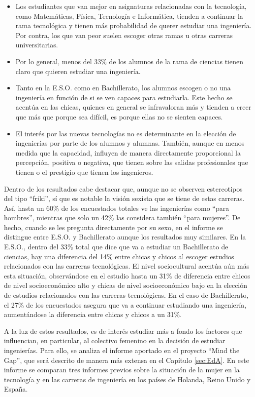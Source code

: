 \documentclass[runningheads,a4paper]{llncs}
\begin{document}
\begin{itemize}
  \item Los estudiantes que van mejor en asignaturas relacionadas con la tecnología, como Matemáticas, Física, Tecnología e Informática, tienden a continuar la rama tecnológica y tienen más probabilidad de querer estudiar una ingeniería. Por contra, los que van peor suelen escoger otras ramas u otras carreras universitarias.
  \item Por lo general, menos del 33\% de los alumnos de la rama de ciencias tienen claro que quieren estudiar una ingeniería.
  \item Tanto en la E.S.O. como en Bachillerato, los alumnos escogen o no una ingeniería en función de si se ven capaces para estudiarla. Este hecho se acentúa en las chicas, quienes en general se infravaloran más y tienden a creer que más que porque sea difícil, es porque ellas no se sienten capaces.
  \item El interés por las nuevas tecnologías no es determinante en la elección de ingenierías por parte de los alumnos y alumnas. También, aunque en menos medida que la capacidad, influyen de manera directamente proporcional la percepción, positiva o negativa, que tienen sobre las salidas profesionales que tienen o el prestigio que tienen los ingenieros.
\end{itemize}

Dentro de los resultados cabe destacar que, aunque no se observen estereotipos del tipo ``friki'', sí que es notable la visión sexista que se tiene de estas carreras. Así, hasta un 60\% de los encuestados totales ve las ingenierías como ``para hombres'', mientras que solo un 42\% las considera también ``para mujeres''. De hecho, cuando se les pregunta directamente por su sexo, en el informe se distingue entre E.S.O. y Bachillerato aunque los resultados muy similares. En la E.S.O., dentro del 33\% total que dice que va a estudiar un Bachillerato de ciencias, hay una diferencia del 14\% entre chicas y chicos al escoger estudios relacionados con las carreras tecnológicas. El nivel sociocultural acentúa aún más esta situación, observándose en el estudio hasta un 31\% de diferencia entre chicos de nivel socioeconómico alto y chicas de nivel socioeconómico bajo en la elección de estudios relacionados con las carreras tecnológicas. En el caso de Bachillerato, el 27\% de los encuestados asegura que va a continuar estudiando una ingeniería, aumentándose la diferencia entre chicas y chicos a un 31\%.

A la luz de estos resultados, es de interés estudiar más a fondo los factores que influencian, en particular, al colectivo femenino en la decisión de estudiar ingenierías. Para ello, se analiza el informe aportado en el proyecto ``Mind the Gap'', que será descrito de manera más extensa en el Capítulo \ref{sec:EdA}. En este informe \cite{mtg2015} se comparan tres informes previos sobre la situación de la mujer en la tecnología y en las carreras de ingeniería en los países de Holanda, Reino Unido y España.
\end{document}
